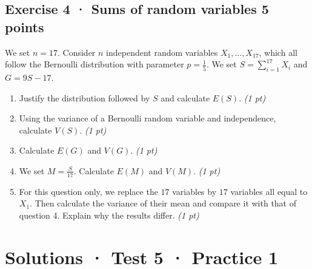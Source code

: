 \subsection*{Exercise 4 · Sums of random variables \hfill 5 points}We set $n=17$. Consider $n$ independent random variables $X_1,\ldots,X_{17}$, which all follow the Bernoulli distribution with parameter $p=\frac{1}{5}$. We set $S=\displaystyle\sum_{i=1}^{17}X_i$ and $G=9S-17$.

\begin{enumerate}

\item Justify the distribution followed by $S$ and calculate $E(S)$. \hfill\textit{(1 pt)}

\item Using the variance of a Bernoulli random variable and independence, calculate $V(S)$. \hfill\textit{(1 pt)}

\item Calculate $E(G)$ and $V(G)$. \hfill\textit{(1 pt)}

\item We set $M=\frac S{17}$. Calculate $E(M)$ and $V(M)$. \hfill\textit{(1 pt)}

\item For this question only, we replace the $17$ variables by $17$ variables all equal to $X_1$. Then calculate the variance of their mean and compare it with that of question 4. Explain why the results differ. \hfill\textit{(1 pt)}

\end{enumerate}

\ifprof\clearpage

\section*{Solutions · Test 5 · Practice 1}\label{cor:7-1}

